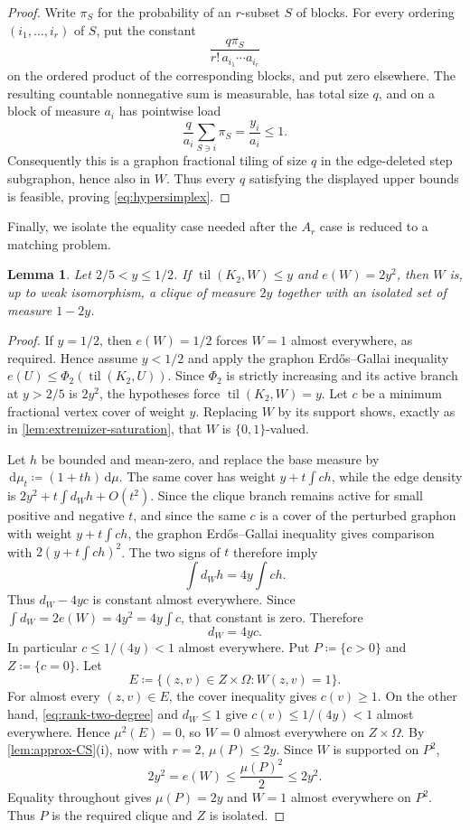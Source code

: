 \documentclass[10pt]{article}
\numberwithin{equation}{section}
\newtheorem{lemma}[lemma]{Lemma}
\newcommand{\til}{\operatorname{til}}
\newcommand{\dd}{\,\mathrm d}
\begin{document}
\begin{proof}
Write $\pi_S$ for the probability of an $r$-subset $S$ of blocks.  For every ordering $(i_1,\ldots,i_r)$ of $S$, put the constant
\[
 \frac{q\pi_S}{r!\,a_{i_1}\cdots a_{i_r}}
\]
on the ordered product of the corresponding blocks, and put zero elsewhere.  The resulting countable nonnegative sum is measurable, has total size $q$, and on a block of measure $a_i$ has pointwise load
\[
 \frac{q}{a_i}\sum_{S\ni i}\pi_S=\frac{y_i}{a_i}\le1.
\]
Consequently this is a graphon fractional tiling of size $q$ in the edge-deleted step subgraphon, hence also in $W$.  Thus every $q$ satisfying the displayed upper bounds is feasible, proving \cref{eq:hypersimplex}.
\end{proof}

Finally, we isolate the equality case needed after the $A_r$ case is reduced to a matching problem.

\begin{lemma}\label{lem:rank-two-equality}
Let $2/5<y\le1/2$.  If $\til(K_2,W)\le y$ and $e(W)=2y^2$, then $W$ is, up to weak isomorphism, a clique of measure $2y$ together with an isolated set of measure $1-2y$.
\end{lemma}

\begin{proof}
If $y=1/2$, then $e(W)=1/2$ forces $W=1$ almost everywhere, as required.  Hence assume $y<1/2$ and apply the graphon Erd\H{o}s--Gallai inequality $e(U)\le \Phi_2(\til(K_2,U))$.  Since $\Phi_2$ is strictly increasing and its active branch at $y>2/5$ is $2y^2$, the hypotheses force $\til(K_2,W)=y$.  Let $c$ be a minimum fractional vertex cover of weight $y$.  Replacing $W$ by its support shows, exactly as in \cref{lem:extremizer-saturation}, that $W$ is $\{0,1\}$-valued.

Let $h$ be bounded and mean-zero, and replace the base measure by $\dd\mu_t\coloneqq(1+th)\dd\mu$.  The same cover has weight $y+t\int ch$, while the edge density is $2y^2+t\int d_Wh+O(t^2)$.  Since the clique branch remains active for small positive and negative $t$, and since the same $c$ is a cover of the perturbed graphon with weight $y+t\int ch$, the graphon Erd\H{o}s--Gallai inequality gives comparison with $2(y+t\int ch)^2$.  The two signs of $t$ therefore imply
\[
 \int d_Wh=4y\int ch.
\]
Thus $d_W-4yc$ is constant almost everywhere.  Since $\int d_W=2e(W)=4y^2=4y\int c$, that constant is zero.  Therefore
\begin{equation}\label{eq:rank-two-degree}
 d_W=4yc.
\end{equation}
In particular $c\le1/(4y)<1$ almost everywhere.  Put $P\coloneqq\{c>0\}$ and $Z\coloneqq\{c=0\}$.  Let
\[
 E\coloneqq\{(z,v)\in Z\times\Omega\colon W(z,v)=1\}.
\]
For almost every $(z,v)\in E$, the cover inequality gives $c(v)\ge1$.  On the other hand, \cref{eq:rank-two-degree} and $d_W\le1$ give $c(v)\le1/(4y)<1$ almost everywhere.  Hence $\mu^2(E)=0$, so $W=0$ almost everywhere on $Z\times\Omega$.  By \cref{lem:approx-CS}(i), now with $r=2$, $\mu(P)\le2y$.  Since $W$ is supported on $P^2$,
\[
 2y^2=e(W)\le\frac{\mu(P)^2}{2}\le2y^2.
\]
Equality throughout gives $\mu(P)=2y$ and $W=1$ almost everywhere on $P^2$.  Thus $P$ is the required clique and $Z$ is isolated.
\end{proof}
\end{document}
